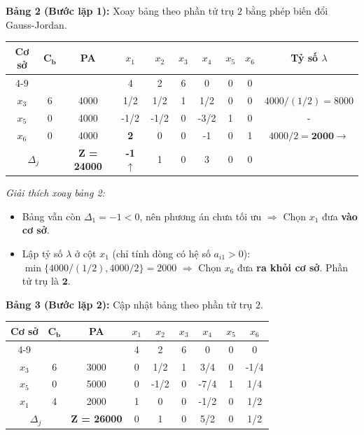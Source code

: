 \vspace{0.3cm}
\textbf{Bảng 2 (Bước lặp 1):} Xoay bảng theo phần tử trụ $2$ bằng phép biến đổi Gauss-Jordan.
\begin{table}[H]
    \centering
    \renewcommand{\arraystretch}{1.3}
    \begin{tabular}{|c|c|c|c|c|c|c|c|c|c|}
        \hline
        \multirow{2}{*}{\textbf{Cơ sở}} & \multirow{2}{*}{$\mathbf{C_b}$} & \multirow{2}{*}{\textbf{PA}} & $x_1$ & $x_2$ & $x_3$ & $x_4$ & $x_5$ & $x_6$ & \multirow{2}{*}{\textbf{Tỷ số $\lambda$}} \\
        \cline{4-9}
        & & & 4 & 2 & 6 & 0 & 0 & 0 & \\
        \hline
        $x_3$ & 6 & 4000 & 1/2 & 1/2 & 1 & 1/2 & 0 & 0 & $4000 / (1/2) = 8000$ \\
        \hline
        $x_5$ & 0 & 4000 & -1/2 & -1/2 & 0 & -3/2 & 1 & 0 & - \\
        \hline
        $x_6$ & 0 & 4000 & \textbf{2} & 0 & 0 & -1 & 0 & 1 & $4000 / 2 = \mathbf{2000} \rightarrow$ \\
        \hline
        \multicolumn{2}{|c|}{$\Delta_j$} & \textbf{Z = 24000} & \textbf{-1} $\uparrow$ & 1 & 0 & 3 & 0 & 0 & \\
        \hline
    \end{tabular}
\end{table}
\textit{Giải thích xoay bảng 2:}
\begin{itemize}[itemsep=0pt, parsep=0pt, topsep=0pt]
    \item Bảng vẫn còn $\Delta_1 = -1 < 0$, nên phương án chưa tối ưu $\Rightarrow$ Chọn $x_1$ đưa \textbf{vào cơ sở}.
    \item Lập tỷ số $\lambda$ ở cột $x_1$ (chỉ tính dòng có hệ số $a_{i1} > 0$): $\min\{4000 / (1/2), 4000/2\} = 2000$ $\Rightarrow$ Chọn $x_6$ đưa \textbf{ra khỏi cơ sở}. Phần tử trụ là $\mathbf{2}$.
\end{itemize}

\vspace{0.3cm}
\textbf{Bảng 3 (Bước lặp 2):} Cập nhật bảng theo phần tử trụ $2$.
\begin{table}[H]
    \centering
    \renewcommand{\arraystretch}{1.3}
    \begin{tabular}{|c|c|c|c|c|c|c|c|c|}
        \hline
        \multirow{2}{*}{\textbf{Cơ sở}} & \multirow{2}{*}{$\mathbf{C_b}$} & \multirow{2}{*}{\textbf{PA}} & $x_1$ & $x_2$ & $x_3$ & $x_4$ & $x_5$ & $x_6$ \\
        \cline{4-9}
        & & & 4 & 2 & 6 & 0 & 0 & 0 \\
        \hline
        $x_3$ & 6 & 3000 & 0 & 1/2 & 1 & 3/4 & 0 & -1/4 \\
        \hline
        $x_5$ & 0 & 5000 & 0 & -1/2 & 0 & -7/4 & 1 & 1/4 \\
        \hline
        $x_1$ & 4 & 2000 & 1 & 0 & 0 & -1/2 & 0 & 1/2 \\
        \hline
        \multicolumn{2}{|c|}{$\Delta_j$} & \textbf{Z = 26000} & 0 & 1 & 0 & 5/2 & 0 & 1/2 \\
        \hline
    \end{tabular}
\end{table}

